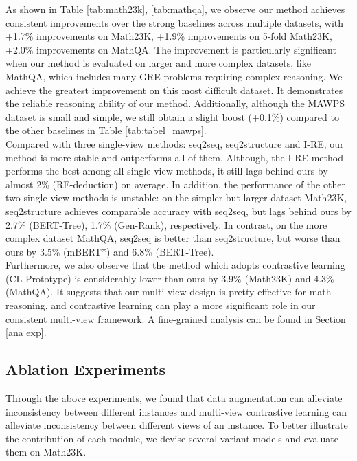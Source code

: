 \documentclass[11pt]{article}
\begin{document}
 \indent  As shown in Table \ref{tab:math23k}, \ref{tab:mathqa}, we observe our method achieves consistent improvements over the strong baselines across multiple datasets, with +1.7\% improvements on Math23K, +1.9\% improvements on 5-fold Math23K, +2.0\% improvements on MathQA. The improvement is particularly significant when our method is evaluated on larger and more complex datasets, like MathQA, which includes many GRE problems requiring complex reasoning. We achieve the greatest improvement on this most difficult dataset. It demonstrates the reliable reasoning ability of our method. Additionally, although the MAWPS dataset is small and simple, we still obtain a slight boost (+0.1\%) compared to the other baselines in Table \ref{tab:tabel_mawps}.\\
\indent Compared with three single-view methods: seq2seq, seq2structure and I-RE, our method is more stable and outperforms all of them. Although, the I-RE method performs the best among all single-view methods, it still lags behind ours by almost 2\% (RE-deduction) on average. In addition, the performance of the other two single-view methods is unstable: on the simpler but larger dataset Math23K, seq2structure achieves comparable accuracy with seq2seq, but lags behind ours by 2.7\% (BERT-Tree), 1.7\% (Gen-Rank), respectively. In contrast, on the more complex dataset MathQA, seq2seq is better than seq2structure, but worse than ours by 3.5\% (mBERT*) and 6.8\% (BERT-Tree).\\
\indent Furthermore, we also observe that the method which adopts contrastive learning (CL-Prototype) is considerably lower than ours by 3.9\% (Math23K) and 4.3\% (MathQA). It suggests that our multi-view design is pretty effective for math reasoning, and contrastive learning can play a more significant role in our consistent multi-view framework. A fine-grained analysis can be found in Section \ref{ana exp}.
\subsection{Ablation Experiments}
Through the above experiments, we found that data augmentation can alleviate inconsistency between different instances and multi-view contrastive learning can alleviate inconsistency between different views of an instance. To better illustrate the contribution of each module, we devise several variant models and evaluate them on Math23K.
\end{document}
